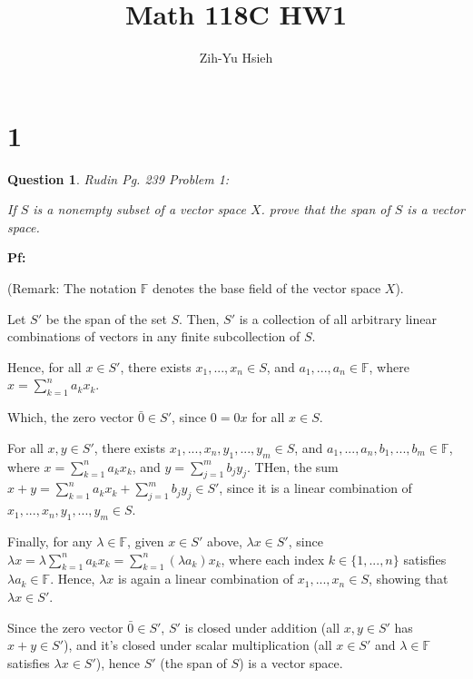 \documentclass{article}
\title{Math 118C HW1}
\author{Zih-Yu Hsieh}
\newtheorem{question}{Question}
\begin{document}
\maketitle

\section*{1}
\begin{myBox}[]{}
    \begin{question}
        Rudin Pg. 239 Problem 1:

        If $S$ is a nonempty subset of a vector space $X$. prove that the span of $S$ is a vector space.
    \end{question}
\end{myBox}

\textbf{Pf:}

(Remark: The notation $\mathbb{F}$ denotes the base field of the vector space $X$).

Let $S'$ be the span of the set $S$. Then, $S'$ is a collection of all arbitrary linear combinations of vectors in any finite subcollection of $S$.

Hence, for all $x\in S'$, there exists $x_1,...,x_n\in S$, and $a_1,...,a_n\in\mathbb{F }$, where $x=\sum_{k=1}^{n}a_kx_k$.

Which, the zero vector $\bar{0}\in S'$, since $0 = 0 x$ for all $x\in S$.

For all $x,y\in S'$, there exists $x_1,...,x_n, y_1,...,y_m\in S$, and $a_1,...,a_n,b_1,...,b_m\in\mathbb{F}$, where $x=\sum_{k=1}^{n}a_kx_k$, and $y=\sum_{j=1}^{m}b_jy_j$.
THen, the sum $x+y=\sum_{k=1}^{n}a_kx_k+\sum_{j=1}^{m}b_jy_j\in S'$, since it is a linear combination of $x_1,...,x_n,y_1,...,y_m\in S$.

Finally, for any $\lambda\in\mathbb{F}$, given $x\in S'$ above, $\lambda x\in S'$, since $\lambda x=\lambda \sum_{k=1}^{n}a_kx_k = \sum_{k=1}^{n}(\lambda a_k)x_k$, where each index $k\in \{1,...,n\}$ satisfies $\lambda a_k\in\mathbb{F}$.
Hence, $\lambda x$ is again a linear combination of $x_1,...,x_n\in S$, showing that $\lambda x\in S'$.

\hfil

Since the zero vector $\bar{0}\in S'$, $S'$ is closed under addition (all $x,y\in S'$ has $x+y\in S'$), and it's closed under scalar multiplication (all $x\in S'$ and $\lambda\in\mathbb{F}$ satisfies $\lambda x\in S'$), hence $S'$ (the span of $S$) is a vector space.

\break
\end{document}
